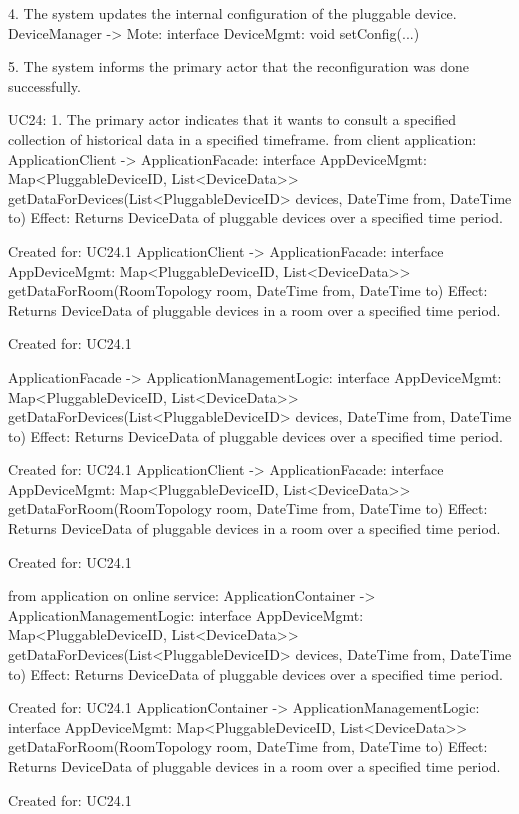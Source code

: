             4. The system updates the internal configuration of the pluggable device.
                    DeviceManager -> Mote: interface DeviceMgmt: void setConfig(...)

            5. The system informs the primary actor that the reconfiguration was done successfully.


        UC24:
            1. The primary actor indicates that it wants to consult a specified collection of historical data in a specified timeframe.
                from client application:
                    ApplicationClient -> ApplicationFacade: interface AppDeviceMgmt: Map<PluggableDeviceID, List<DeviceData>> getDataForDevices(List<PluggableDeviceID> devices, DateTime from, DateTime to)
                        Effect: Returns DeviceData of pluggable devices over a specified time period.
                        \item Created for: UC24.1
                    ApplicationClient -> ApplicationFacade: interface AppDeviceMgmt: Map<PluggableDeviceID, List<DeviceData>> getDataForRoom(RoomTopology room, DateTime from, DateTime to)
                        Effect: Returns DeviceData of pluggable devices in a room over a specified time period.
                        \item Created for: UC24.1

                    ApplicationFacade -> ApplicationManagementLogic: interface AppDeviceMgmt: Map<PluggableDeviceID, List<DeviceData>> getDataForDevices(List<PluggableDeviceID> devices, DateTime from, DateTime to)
                        Effect: Returns DeviceData of pluggable devices over a specified time period.
                        \item Created for: UC24.1
                    ApplicationClient -> ApplicationFacade: interface AppDeviceMgmt: Map<PluggableDeviceID, List<DeviceData>> getDataForRoom(RoomTopology room, DateTime from, DateTime to)
                        Effect: Returns DeviceData of pluggable devices in a room over a specified time period.
                        \item Created for: UC24.1

                from application on online service:
                    ApplicationContainer -> ApplicationManagementLogic: interface AppDeviceMgmt: Map<PluggableDeviceID, List<DeviceData>> getDataForDevices(List<PluggableDeviceID> devices, DateTime from, DateTime to)
                        Effect: Returns DeviceData of pluggable devices over a specified time period.
                        \item Created for: UC24.1
                    ApplicationContainer -> ApplicationManagementLogic: interface AppDeviceMgmt: Map<PluggableDeviceID, List<DeviceData>> getDataForRoom(RoomTopology room, DateTime from, DateTime to)
                        Effect: Returns DeviceData of pluggable devices in a room over a specified time period.
                        \item Created for: UC24.1

